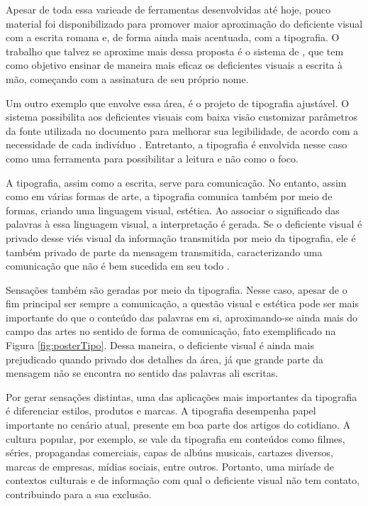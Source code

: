 Apesar de toda essa varieade de ferramentas desenvolvidas até hoje, pouco material foi disponibilizado para promover maior aproximação do deficiente visual com a escrita romana e, de forma ainda mais acentuada, com a tipografia. O trabalho que talvez se aproxime mais dessa proposta é o sistema de , que tem como objetivo ensinar de maneira mais eficaz os deficientes visuais a escrita à mão, começando com a assinatura de seu próprio nome.


Um outro exemplo que envolve essa área, é o projeto de tipografia ajustável. O sistema possibilita aos deficientes visuais com baixa visão customizar parâmetros da fonte utilizada no documento para melhorar sua legibilidade, de acordo com a necessidade de cada indivíduo . Entretanto, a tipografia é envolvida nesse caso como uma ferramenta para possibilitar a leitura e não como o foco.


A tipografia, assim como a escrita, serve para comunicação. No entanto, assim como em várias formas de arte, a tipografia comunica também por meio de formas, criando uma linguagem visual, estética. Ao associar o significado das palavras à essa linguagem visual, a interpretação é gerada. Se o deficiente visual é privado desse viés visual da informação transmitida por meio da tipografia, ele é também privado de parte da mensagem transmitida, caracterizando uma comunicação que não é bem sucedida em seu todo .

Sensações também são geradas por meio da tipografia. Nesse caso, apesar de o fim principal ser sempre a comunicação, a questão visual e estética pode ser mais importante do que o conteúdo das palavras em si, aproximando-se ainda mais do campo das artes no sentido de forma de comunicação, fato exemplificado na Figura \ref{fig:posterTipo}. Dessa maneira, o deficiente visual é ainda mais prejudicado quando privado dos detalhes da área, já que grande parte da mensagem não se encontra no sentido das palavras ali escritas.


Por gerar sensações distintas, uma das aplicações mais importantes da tipografia é diferenciar estilos, produtos e marcas. A tipografia desempenha papel importante no cenário atual, presente em boa parte dos artigos do cotidiano. A cultura popular, por exemplo, se vale da tipografia em conteúdos como filmes, séries, propagandas comerciais, capas de albúns musicais, cartazes diversos, marcas de empresas, mídias sociais, entre outros. Portanto, uma miríade de contextos culturais e de informação com qual o deficiente visual não tem contato, contribuindo para a sua exclusão.

